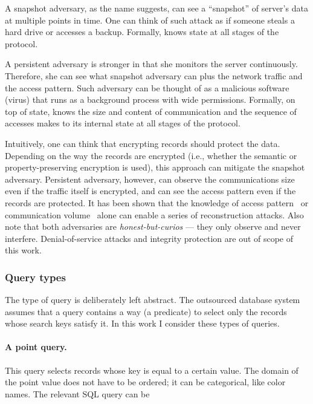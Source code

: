 				A snapshot adversary, as the name suggests, can see a ``snapshot'' of server's data at multiple points in time.
				One can think of such attack as if someone steals a hard drive or accesses a backup.
				Formally, \adversary{} knows \server{} state at all stages of the protocol.

				A persistent adversary is stronger in that she monitors the server continuously.
				Therefore, she can see what snapshot adversary can plus the network traffic and the access pattern.
				Such adversary can be thought of as a malicious software (virus) that runs as a background process with wide permissions.
				Formally, on top of \server{} state, \adversary{} knows the size and content of \server{} communication and the sequence of accesses \server{} makes to its internal state at all stages of the protocol.

				Intuitively, one can think that encrypting records should protect the data.
				Depending on the way the records are encrypted (i.e., whether the semantic or property-preserving encryption is used), this approach can mitigate the snapshot adversary.
				Persistent adversary, however, can observe the communications size even if the traffic itself is encrypted, and can see the access pattern even if the records are protected.
				It has been shown that the knowledge of access pattern~\cite{multidimensional-range-queries, inference-attack-islam-14, leakage-abuse-attacks-cash-15, inference-attacks-naveed-15, generic-attacks-kellaris, attacks-tao-of-inference, grubbs-attacks, access-pattern-disclosure, attacks-improved-reconstruction} or communication volume~\cite{generic-attacks-kellaris, state-of-uniform, attacks-improved-reconstruction, pump-volume-attacks, volume-range-attacks} alone can enable a series of reconstruction attacks.
				Also note that both adversaries are \emph{honest-but-curios} --- they only observe and never interfere.
				Denial-of-service attacks and integrity protection are out of scope of this work.

			\subsubsection{Query types}

				The type of query \query{} is deliberately left abstract.
				The outsourced database system assumes that a query contains a way (a predicate) to select only the records whose search keys satisfy it.
				In this work I consider these types of queries.

				\paragraph*{A point query.}
					This query selects records whose key is equal to a certain value.
					The domain of the point value does not have to be ordered; it can be categorical, like color names.
					The relevant SQL query can be

